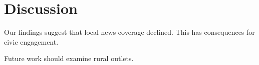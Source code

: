\documentclass{article}
\begin{document}
\section{Discussion}
\label{sec:discussion}

Our findings suggest that local news coverage declined.
This has consequences for civic engagement.

Future work should examine rural outlets.
\end{document}
